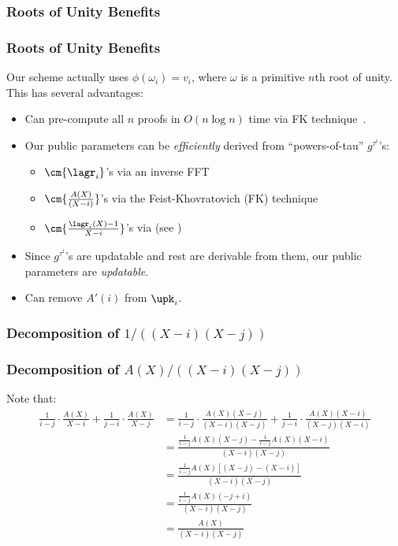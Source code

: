 \subsubsection{Roots of Unity Benefits}
\begin{frame}
    \frametitle{Roots of Unity Benefits}

    Our scheme actually uses $\phi(\omega_i)=v_i$, where $\omega$ is a primitive $n$th \alert{root of unity}.\pause\xspace
    This has several advantages:\pause

    \begin{itemize}
        \item Can pre-compute all $n$ proofs in $O(n\log{n})$ time via FK technique~\cite{FK20}.\pause
        \item Our public parameters can be \textit{efficiently} derived from ``powers-of-tau'' $g^{\tau^i}$'s:\pause
        \begin{itemize}
            \item $\cm{\lagr_i}$'s via an inverse FFT~\cite{Virza17}\pause
            \item $\cm{\frac{A(X)}{(X-i)}}$'s via the Feist-Khovratovich (FK) technique~\cite{FK20}\pause
            \item $\cm{\frac{\lagr_i(X)-1}{X-i}}$'s via  (see \cite[Sec 3.4.5]{TAB+20e})\pause
        \end{itemize}
        \item Since $g^{\tau^i}$'s are updatable and rest are derivable from them, our public parameters are \textit{updatable}.\pause
        \item Can remove $A'(i)$ from $\upk_i$.
    \end{itemize}
\end{frame}

\subsubsection{Decomposition of $1/((X-i)(X-j))$}
\label{s:decompose-proof-update}
\begin{frame}
    \frametitle{Decomposition of $A(X)/\left((X-i)(X-j)\right)$}

    Note that:
    \begin{align}
    \label{eq:decompose-proof-update}
    \frac{1}{i-j}\cdot \frac{A(X)}{X-i} + \frac{1}{j-i}\cdot \frac{A(X)}{X-j}
        &= \frac{1}{i-j}\cdot \frac{A(X)(X-j)}{(X-i)(X-j)} + \frac{1}{j-i}\cdot \frac{A(X)(X-i)}{(X-j)(X-i)}\\
        &= \frac{\frac{1}{i-j}A(X)(X-j)-\frac{1}{i-j}A(X)(X-i)}{(X-i)(X-j)}\\
        &= \frac{\frac{1}{i-j}A(X)[(X-j)-(X-i)]}{(X-i)(X-j)}\\
        &= \frac{\frac{1}{i-j}A(X)(-j+i)}{(X-i)(X-j)}\\
        &= \frac{A(X)}{(X-i)(X-j)}
    \end{align}
\end{frame}

